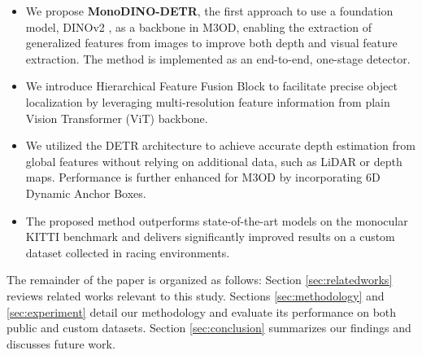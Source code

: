 \begin{itemize}
\item We propose \textbf{MonoDINO-DETR}, the first approach to use a foundation model, DINOv2 \cite{oquab2023dinov2}, as a backbone in M3OD, enabling the extraction of generalized features from images to improve both depth and visual feature extraction. The method is implemented as an end-to-end, one-stage detector.

\item We introduce Hierarchical Feature Fusion Block to facilitate precise object localization by leveraging multi-resolution feature information from plain Vision Transformer (ViT) \cite{dosovitskiy2020image} backbone.

\item We utilized the DETR architecture to achieve accurate depth estimation from global features without relying on additional data, such as LiDAR or depth maps. Performance is further enhanced for M3OD by incorporating 6D Dynamic Anchor Boxes.

\item The proposed method outperforms state-of-the-art models on the monocular KITTI \cite{geiger2012we} benchmark and delivers significantly improved results on a custom dataset collected in racing environments.
\end{itemize}

The remainder of the paper is organized as follows: Section \ref{sec:relatedworks} reviews related works relevant to this study. Sections \ref{sec:methodology} and \ref{sec:experiment} detail our methodology and evaluate its performance on both public and custom datasets. Section \ref{sec:conclusion} summarizes our findings and discusses future work.